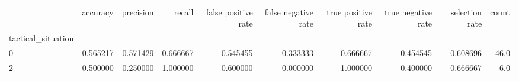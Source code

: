 \begin{tabular}{lrrrrrrrrr}
\toprule
{} &  accuracy &  precision &    recall &  false positive rate &  false negative rate &  true positive rate &  true negative rate &  selection rate &  count \\
tactical\_situation &           &            &           &                      &                      &                     &                     &                 &        \\
\midrule
0                  &  0.565217 &   0.571429 &  0.666667 &             0.545455 &             0.333333 &            0.666667 &            0.454545 &        0.608696 &   46.0 \\
2                  &  0.500000 &   0.250000 &  1.000000 &             0.600000 &             0.000000 &            1.000000 &            0.400000 &        0.666667 &    6.0 \\
\bottomrule
\end{tabular}
